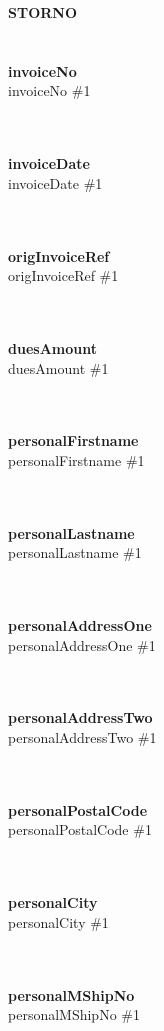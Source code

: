 \documentclass[12pt, paper = a4]{scrlttr2}
\newcommand{\nix}{}
\newcommand{\checkIfSet}[3]{%
  \ifcsname #1\endcsname%
    \ifx\#1\nix%
      #3%
    \else%
      #2%
    \fi%
  \else%
    #3%
  \fi%
}%
\begin{document}
\textbf{STORNO} \\
\\
\\
\textbf{invoiceNo} \\
\checkIfSet{invoiceNo}{\invoiceNo} \\
\\
\textbf{invoiceDate} \\
\checkIfSet{invoiceDate}{\invoiceDate} \\
\\
\textbf{origInvoiceRef} \\
\checkIfSet{origInvoiceRef}{\origInvoiceRef} \\
\\
\textbf{duesAmount} \\
\checkIfSet{duesAmount}{\duesAmount} \\
\\
\textbf{personalFirstname} \\
\checkIfSet{personalFirstname}{\personalFirstname} \\
\\
\textbf{personalLastname} \\
\checkIfSet{personalLastname}{\personalLastname} \\
\\
\textbf{personalAddressOne} \\
\checkIfSet{personalAddressOne}{\personalAddressOne} \\
\\
\textbf{personalAddressTwo} \\
\checkIfSet{personalAddressTwo}{\personalAddressTwo} \\
\\
\textbf{personalPostalCode} \\
\checkIfSet{personalPostalCode}{\personalPostalCode} \\
\\
\textbf{personalCity} \\
\checkIfSet{personalCity}{\personalCity} \\
\\
\textbf{personalMShipNo} \\
\checkIfSet{personalMShipNo}{\personalMShipNo} \\
\\
\end{document}
